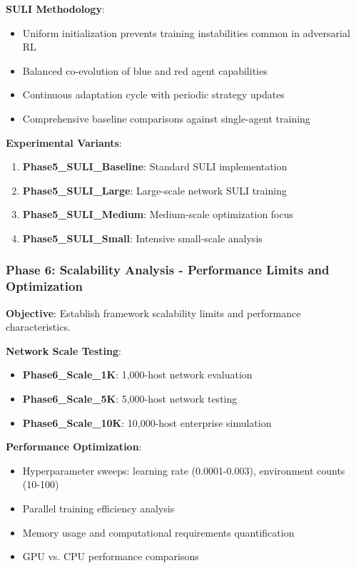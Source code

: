 \documentclass[11pt]{article}
\theoremstyle{definition}
\theoremstyle{plain}
\begin{document}
\textbf{SULI Methodology}:
\begin{itemize}
\item Uniform initialization prevents training instabilities common in adversarial RL
\item Balanced co-evolution of blue and red agent capabilities
\item Continuous adaptation cycle with periodic strategy updates
\item Comprehensive baseline comparisons against single-agent training
\end{itemize}

\textbf{Experimental Variants}:
\begin{enumerate}
\item \textbf{Phase5\_SULI\_Baseline}: Standard SULI implementation
\item \textbf{Phase5\_SULI\_Large}: Large-scale network SULI training
\item \textbf{Phase5\_SULI\_Medium}: Medium-scale optimization focus
\item \textbf{Phase5\_SULI\_Small}: Intensive small-scale analysis
\end{enumerate}

\subsubsection{Phase 6: Scalability Analysis - Performance Limits and Optimization}
\textbf{Objective}: Establish framework scalability limits and performance characteristics.

\textbf{Network Scale Testing}:
\begin{itemize}
\item \textbf{Phase6\_Scale\_1K}: 1,000-host network evaluation
\item \textbf{Phase6\_Scale\_5K}: 5,000-host network testing
\item \textbf{Phase6\_Scale\_10K}: 10,000-host enterprise simulation
\end{itemize}

\textbf{Performance Optimization}:
\begin{itemize}
\item Hyperparameter sweeps: learning rate (0.0001-0.003), environment counts (10-100)
\item Parallel training efficiency analysis
\item Memory usage and computational requirements quantification
\item GPU vs. CPU performance comparisons
\end{itemize}
\end{document}
